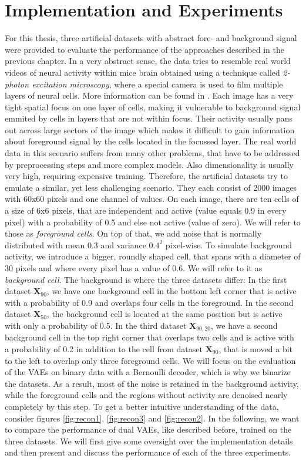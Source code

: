 \documentclass[12pt]{report}
\theoremstyle{definition}
\begin{document}
\chapter{Implementation and Experiments}
For this thesis, three artificial datasets with abstract fore- and background signal were provided to evaluate the performance of the approaches described in the previous chapter. In a very abstract sense, the data tries to resemble real world videos of neural activity within mice brain obtained using a technique called \emph{2-photon excitation microscopy}, where a special camera is used to film multiple layers of neural cells. More information can be found in \cite{phot}. Each image has a very tight spatial focus on one layer of cells, making it vulnerable to background signal emmited by cells in layers that are not within focus. Their activity usually pans out across large sectors of the image which  makes it difficult to gain information about foreground signal by the cells located in the focussed layer. The real world data in this scenario suffers from many other problems, that have to be addressed by preprocessing steps and more complex models. Also dimensionality is usually very high, requiring expensive training.
Therefore, the artificial datasets try to emulate a similar, yet less challenging scenario. They each consist of 2000 images with 60x60 pixels and one channel of values. On each image, there are ten cells of a size of 6x6 pixels, that are independent and active (value equals 0.9 in every pixel) with a probability of 0.5 and else not active (value of zero).  We will refer to those as \emph{foreground cells}. On top of that, we add noise that is normally distributed with mean $0.3$ and variance $0.4^2$ pixel-wise. To simulate background activity, we introduce a bigger, roundly shaped cell, that spans with a diameter of 30 pixels and where every pixel has a value of 0.6. We will refer to it as \emph{background cell}. The background is where the three datasets differ: In the first dataset $\mathbf{X}_{90}$, we have one background cell in the bottom left corner that is active with a probability of 0.9 and overlaps four cells in the foreground. In the second dataset $\mathbf{X}_{50}$, the background cell is located at the same position but is active with only a probability of 0.5. In the third dataset $\mathbf{X}_{90, 20}$, we have a second background cell in the top right corner that overlaps two cells and is active with a probability of 0.2 in addition to the cell from dataset $\mathbf{X}_{90}$, that is moved a bit to the left to overlap only three foreground cells. We will focus on the evaluation of the VAEs on binary data with a Bernoulli decoder, which is why we binarize the datasets. As a result, most of the noise is retained in the background activity, while the foreground cells and the regions without activity are denoised nearly completely by this step. To get a better intuitive understanding of the data, consider figures \ref{fig:recon1}, \ref{fig:recon3} and \ref{fig:recon2}. In the following, we want to compare the performance of dual VAEs, like described before, trained on the three datasets. We will first give some oversight over the implementation details and then present and discuss the performance of each of the three experiments.
\end{document}

